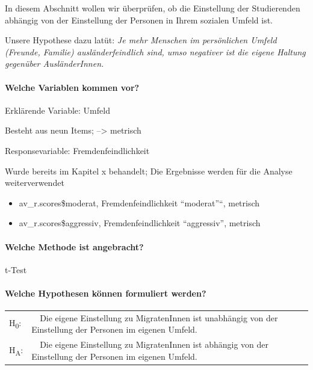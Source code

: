 \documentclass[]{article}
\let\oldparagraph\paragraph
\renewcommand{\paragraph}[1]{\oldparagraph{#1}\mbox{}}
\begin{document}
In diesem Abschnitt wollen wir überprüfen, ob die Einstellung der
Studierenden abhängig von der Einstellung der Personen in Ihrem sozialen
Umfeld ist.

Unsere Hypothese dazu latüt: \emph{Je mehr Menschen im persönlichen
Umfeld (Freunde, Familie) ausländerfeindlich sind, umso negativer ist
die eigene Haltung gegenüber AusländerInnen.}

\paragraph{Welche Variablen kommen
vor?}\label{welche-variablen-kommen-vor}

Erklärende Variable: Umfeld

Besteht aus neun Items; --\textgreater{} metrisch

Responsevariable: Fremdenfeindlichkeit

Wurde bereits im Kapitel x behandelt; Die Ergebnisse werden für die
Analyse weiterverwendet

\begin{itemize}
\item
  av\_r.scores\$moderat, Fremdenfeindlichkeit ``moderat''``, metrisch
\item
  av\_r.scores\$aggressiv, Fremdenfeindlichkeit ``aggressiv'', metrisch
\end{itemize}

\paragraph{Welche Methode ist
angebracht?}\label{welche-methode-ist-angebracht}

t-Test

\paragraph{Welche Hypothesen können formuliert
werden?}\label{welche-hypothesen-konnen-formuliert-werden}

\begin{longtable}[]{@{}ll@{}}
\toprule
\begin{minipage}[t]{0.13\columnwidth}\raggedright\strut
H\textsubscript{0}:\strut
\end{minipage} & \begin{minipage}[t]{0.81\columnwidth}\raggedright\strut
~~Die eigene Einstellung zu MigratenInnen ist unabhängig von der
Einstellung der Personen im eigenen Umfeld.\strut
\end{minipage}\tabularnewline
\begin{minipage}[t]{0.13\columnwidth}\raggedright\strut
H\textsubscript{A}:\strut
\end{minipage} & \begin{minipage}[t]{0.81\columnwidth}\raggedright\strut
~~Die eigene Einstellung zu MigratenInnen ist abhängig von der
Einstellung der Personen im eigenen Umfeld.\strut
\end{minipage}\tabularnewline
\bottomrule
\end{longtable}
\end{document}
